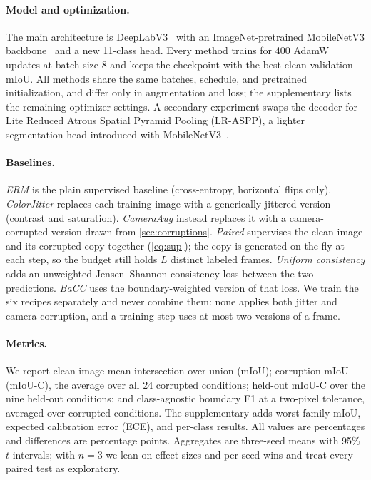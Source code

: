 \documentclass[runningheads]{llncs}
\newcommand{\method}{BaCC}
\newcommand{\miouc}{mIoU-C}
\begin{document}
\paragraph{Model and optimization.}
The main architecture is DeepLabV3~\cite{chen2017deeplab} with an
ImageNet-pretrained MobileNetV3 backbone~\cite{howard2019mobilenetv3} and a
new 11-class head. Every method trains for 400 AdamW updates at batch
size 8 and keeps the checkpoint with the best clean validation mIoU. All
methods share the same batches, schedule, and pretrained initialization, and
differ only in augmentation and loss; the supplementary lists the remaining
optimizer settings. A secondary experiment swaps the decoder for Lite Reduced Atrous Spatial
Pyramid Pooling (LR-ASPP), a lighter segmentation head introduced with
MobileNetV3~\cite{howard2019mobilenetv3}.

\paragraph{Baselines.}
\emph{ERM} is the plain supervised baseline (cross-entropy, horizontal flips
only). \emph{ColorJitter} replaces each training image with a generically
jittered version (contrast and saturation). \emph{CameraAug} instead replaces
it with a camera-corrupted version drawn from \cref{sec:corruptions}. \emph{Paired} supervises the clean image and its
corrupted copy together (\cref{eq:sup}); the copy is generated on the fly at
each step, so the budget still holds $L$ distinct labeled frames.
\emph{Uniform consistency} adds an unweighted Jensen--Shannon consistency loss
between the two predictions. \emph{\method{}} uses the boundary-weighted
version of that loss. We train the six recipes separately and never
combine them: none applies both jitter and camera corruption, and a training
step uses at most two versions of a frame.

\paragraph{Metrics.}
We report clean-image mean intersection-over-union (mIoU); corruption mIoU
(\miouc{}), the average over all 24 corrupted conditions; held-out \miouc{}
over the nine held-out conditions; and class-agnostic boundary F1 at a
two-pixel tolerance, averaged over corrupted conditions. The supplementary
adds worst-family mIoU, expected calibration error (ECE), and per-class
results. All values are percentages and differences are percentage points.
Aggregates are three-seed means with 95\% $t$-intervals; with $n=3$ we lean on
effect sizes and per-seed wins and treat every paired test as exploratory.
\end{document}
